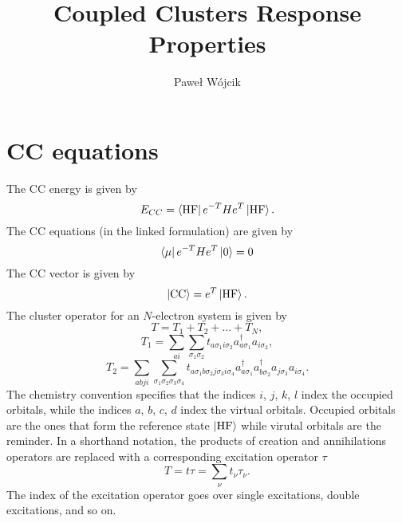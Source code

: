 \documentclass{article}
\title{Coupled Clusters Response Properties}
\author{Pawe\l{} W{\'o}jcik}
\begin{document}
\maketitle

\section{CC equations}
The CC energy is given by 
\begin{equation}
    E _{CC} = 
    \bra{\text{HF}}
    e ^{-T}
    H 
    e ^T
    \ket{\text{HF}}.
    \label{eq:cc_energy}
\end{equation}
The CC equations (in the linked
formulation\autocite{helgakerMolecularElectronicstructureTheory2000}) are given
by
\begin{equation}
    \bra{\mu} e^{-T} H e^T \ket{0} = 0
    \label{eq:cc_equations}
\end{equation}
The CC vector is given by
\begin{equation}
    \ket{\text{CC}} = e ^T \ket{\text{HF}}.
    \label{eq:cc_vector}
\end{equation}
The cluster operator for an $N$-electron system is given by
\begin{equation}
    T = T _1 + T _2 + \ldots + T _N,
    \label{eq:T}
\end{equation}
\begin{equation}
    T _1 
    = 
    \sum _{ai} \sum _ {\sigma_1 \sigma _2}
    t _{a\sigma _1 i \sigma _2}
    a ^\dagger _{a \sigma _1} a _{i \sigma _2},
    \label{eq:T1}
\end{equation}
\begin{equation}
    T _2 
    = 
    \sum _{abji} \sum _ {\sigma_1 \sigma _2 \sigma_3 \sigma _4}
    t _{a\sigma _1 b \sigma _2 j \sigma_3 i \sigma _4}
    a ^\dagger _{a \sigma _1} 
    a ^\dagger _{b \sigma _2} 
    a _{j \sigma _3}
    a _{i \sigma _4}.
    \label{eq:T2}
\end{equation}
The chemistry convention specifies that the indices $i$, $j$, $k$, $l$ index
the occupied orbitals, while the indices $a$, $b$, $c$, $d$ index the virtual
orbitals. Occupied orbitals are the ones that form the reference state
$\ket{\text{HF}}$ while virutal orbitals are the reminder. In a shorthand
notation, the products of creation and annihilations operators are replaced
with a corresponding excitation operator $\tau$
\begin{equation}
    T = t \tau = \sum _\nu t _\nu \tau _\nu.
    \label{eq:T_tau}
\end{equation}
The index of the excitation operator goes over single excitations, double
excitations, and so on.
\end{document}
